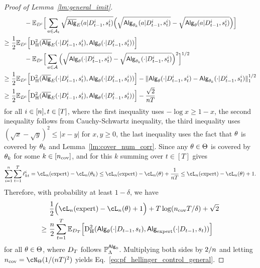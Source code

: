 \begin{proof}[Proof of Lemma~\ref{lm:general_imit}]
\begin{align*}
&\qquad~- \mathbb{E}_{{D}^{i}}\Big[\sum_{{a}\in{\mathcal{A}}_t}\sqrt{\overline{\mathsf{Alg}}_{{E}}({a}|{D}_{t-1}^{i},{s}^{i}_t)}\Big(\sqrt{{\mathsf{Alg}}_{{\theta}_k}({a}|{D}_{t-1}^{i},{s}^{i}_t)}-\sqrt{{\mathsf{Alg}}_{{\theta}}({a}|{D}_{t-1}^{i},{s}^{i}_t)}\Big)\Big]
\\
\geq &~
    \frac{1}{2} \mathbb{E}_{{D}^{i}}\Big[{\mathrm{D}^2_{\mathrm{H}}}(\overline{\mathsf{Alg}}_{{E}}(\cdot|{D}_{t-1}^{i},{s}^{i}_t),{\mathsf{Alg}}_{{\theta}}(\cdot|{D}_{t-1}^{i},{s}^{i}_t))\Big] 
    \\
    &\qquad~-\mathbb{E}_{{D}^{i}}\Big[\sum_{{a}\in{\mathcal{A}}}\Big(\sqrt{{\mathsf{Alg}}_{{\theta}}(\cdot|{D}_{t-1}^{i},{s}^{i}_t)}-\sqrt{{\mathsf{Alg}}_{{\theta}_k}(\cdot|{D}_{t-1}^{i},{s}^{i}_t)}\Big)^2\Big]^{1/2}
\\
\geq &~
 \frac{1}{2} \mathbb{E}_{{D}^{i}}\Big[{\mathrm{D}^2_{\mathrm{H}}}(\overline{\mathsf{Alg}}_{{E}}(\cdot|{D}_{t-1}^{i},{s}^{i}_t),{\mathsf{Alg}}_{{\theta}}(\cdot|{D}_{t-1}^{i},{s}^{i}_t))\Big] 
    -\|{\mathsf{Alg}}_{{\theta}}(\cdot|{D}_{t-1}^{i},{s}^{i}_t)-{\mathsf{Alg}}_{{\theta}_k}(\cdot|{D}_{t-1}^{i},{s}^{i}_t)\|_1^{1/2}
\\
\geq&~
 \frac{1}{2} \mathbb{E}_{{D}^{i}}\Big[{\mathrm{D}^2_{\mathrm{H}}}(\overline{\mathsf{Alg}}_{{E}}(\cdot|{D}_{t-1}^{i},{s}^{i}_t),{\mathsf{Alg}}_{{\theta}}(\cdot|{D}_{t-1}^{i},{s}^{i}_t))\Big] 
  -\frac{\sqrt{2}}{{n}{T}}
\end{align*}
for all $i\in[n],t\in[{T}]$, 
where the first inequality uses $-\log x\geq 1-x$, the second inequality follows from Cauchy-Schwartz inequality, the third inequality uses $(\sqrt{x}-\sqrt{y})^2\leq |x-y|$ for $x,y\geq0$, the last inequality uses the fact that ${\theta}$ is covered by ${\theta}_k$ and Lemma~\ref{lm:cover_num_corr}. Since any ${\theta}\in{\Theta}$ is covered by ${\theta}_k$ for some $k\in[{n_{\mathrm{cov}}}]$, and for this $k$ summing over $t\in[T]$ gives 
$$\sum_{i=1}^\Numobs\sum_{t=1}^\totlen\ell_{kt}^i=\cL_\Numobs(\expert)-\cL_\Numobs(\Par_k) \leq \cL_\Numobs(\expert)-\cL_\Numobs(\Par)+\frac{1}{\Numobs\totlen}\leq \cL_\Numobs(\expert)-\cL_\Numobs(\Par)+1.$$ 
Therefore, with probability at least $1-\delta$, we have
\begin{align*}
&~\frac{1}{2}\Big(\cL_\Numobs(\expert)-\cL_\Numobs(\Par)+1 \Big)+\totlen\log(\Covnum \totlen/\delta)+\sqrt{2}\\
\geq&~ \frac{\Numobs}{2}\sum_{t=1}^\totlen\E_{\dset_\totlen}\Big[\HelDs(\sAlg_\Par(\cdot|\dset_{t-1},\state_t),\sAlg_\expert(\cdot|\dset_{t-1},\state_t))\Big]
\end{align*}
for all ${\theta}\in{\Theta}$, where ${D}_{T}$  follows $\mathbb{P}_{\Lambda}^{{\mathsf{Alg}}_0}$. Multiplying both sides by $2/{n}$ and letting $\Covnum=\cN_{\Parspace}(1/(\Numobs\totlen)^2)$ yields Eq.~\eqref{eq:pf_hellinger_control_general}.
\end{proof}
